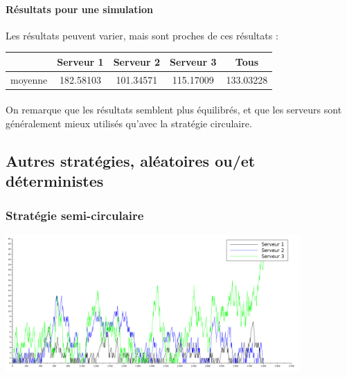 \documentclass{article}
\begin{document}
\paragraph{Résultats pour une simulation}
Les résultats peuvent varier, mais sont proches de ces résultats :
\begin{center}
	\begin{tabular}{c|ccc|c}
		\hline \hline
		& Serveur 1 & Serveur 2 & Serveur 3 & Tous \\
		\hline
		moyenne & 182.58103 & 101.34571 & 115.17009 & 133.03228 \\
		\hline \hline
	\end{tabular}
\end{center}
\paragraph{}
On remarque que les résultats semblent plus équilibrés, et que les serveurs sont généralement mieux utilisés qu'avec la stratégie circulaire.

\subsection{Autres stratégies, aléatoires ou/et déterministes}

\subsubsection{Stratégie semi-circulaire}
\begin{center}
	\includegraphics[width=425px]{img/semiCirculaire.png}
\end{center}
\end{document}
